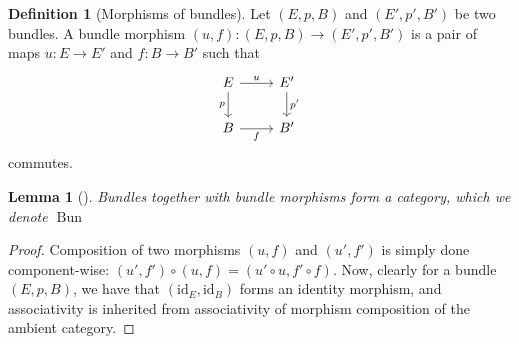 \documentclass[reqno]{amsart}
\newtheorem{lemma}[theorem]{Lemma}
\theoremstyle{definition}
\newtheorem{definition}[theorem]{Definition}
\theoremstyle{remark}
\DeclareMathOperator{\Bun}{Bun}
\newcommand{\id}{{\mathrm{id}}}
\begin{document}
    \newpage

    \begin{definition}[Morphisms of bundles]
        Let $\left( E,p,B \right) $ and
        $\left( E',p',B' \right) $ be two bundles.
        A bundle morphism
        $\left( u,f \right) \colon
        \left( E,p,B \right) \to \left( E',p',B' \right) $ 
        is a pair of maps
        $u \colon E \to E'$ and
        $f \colon B \to B'$ such that
        \begin{equation*}
        \begin{tikzcd}
            E \ar[r, "u"] \ar[d, "p"'] & E' \ar[d, "p'"]\\
            B \ar[r, "f"'] & B'
        \end{tikzcd}
        \end{equation*}
        commutes.
    \end{definition}


    \begin{lemma}[]
        Bundles together with bundle morphisms form a category,
        which we denote $\Bun$
    \end{lemma}

    \begin{proof}
    Composition of two morphisms
    $\left( u,f \right) $ and
    $\left( u',f' \right) $ is simply done component-wise:
    $\left( u',f' \right) \circ
    \left( u,f \right) =
    \left( u' \circ u, f' \circ f \right) $.
    Now, clearly for a bundle $\left( E,p,B \right) $, we have that
    $\left( \id_E, \id_B \right) $ forms an identity morphism, and
    associativity is inherited from associativity of
    morphism composition of the ambient category.






    \end{proof}
\end{document}
